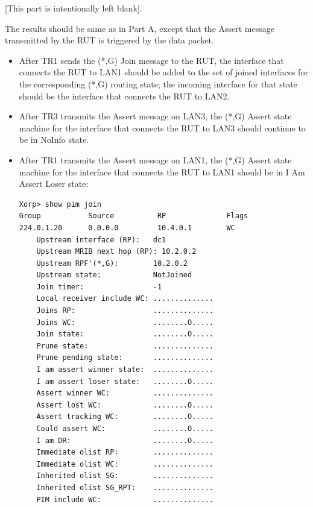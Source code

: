 \documentclass[11pt]{report}
\begin{document}

[This part is intentionally left blank].


The results should be same as in Part A, except that the Assert message
transmitted by the RUT is triggered by the data packet.


\begin{itemize}

  \item After TR1 sends the (*,G) Join message to the RUT, the interface that
  connects the RUT to LAN1 should be added to the set of joined interfaces for
  the corresponding (*,G) routing state; the incoming interface for that state
  should be the interface that connects the RUT to LAN2.

  \item After TR3 transmits the Assert message on LAN3, the (*,G) Assert state
  machine for the interface that connects the RUT to LAN3 should continue to
  be in NoInfo state.

  \item After TR1 transmits the Assert message on LAN1, the (*,G) Assert state
  machine for the interface that connects the RUT to LAN1 should be in I Am
  Assert Loser state:

\begin{verbatim}
Xorp> show pim join 
Group           Source          RP              Flags
224.0.1.20      0.0.0.0         10.4.0.1        WC   
    Upstream interface (RP):   dc1
    Upstream MRIB next hop (RP): 10.2.0.2
    Upstream RPF'(*,G):        10.2.0.2
    Upstream state:            NotJoined 
    Join timer:                -1
    Local receiver include WC: ..............
    Joins RP:                  ..............
    Joins WC:                  ........O.....
    Join state:                ........O.....
    Prune state:               ..............
    Prune pending state:       ..............
    I am assert winner state:  ..............
    I am assert loser state:   ........O.....
    Assert winner WC:          ..............
    Assert lost WC:            ........O.....
    Assert tracking WC:        ........O.....
    Could assert WC:           ........O.....
    I am DR:                   ........O.....
    Immediate olist RP:        ..............
    Immediate olist WC:        ..............
    Inherited olist SG:        ..............
    Inherited olist SG_RPT:    ..............
    PIM include WC:            ..............
\end{verbatim}


\end{itemize}
\end{document}

